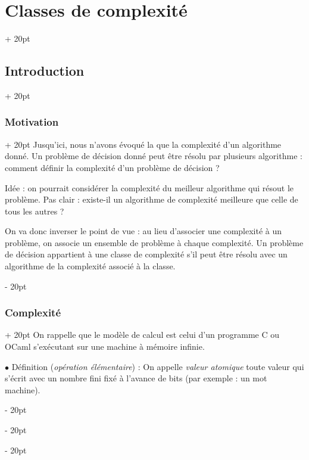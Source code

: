 \documentclass[a4paper, 12pt, twoside]{article}
\newcommand{\ind}[1][20pt]{\advance\leftskip + #1}
\newcommand{\deind}[1][20pt]{\advance\leftskip - #1}
\newenvironment{indt}[2][20pt]{#2 \par \ind[#1]}{\par \deind} %
\begin{document}
    \vspace{12pt}
    
    \begin{indt}{\section{Classes de complexité}}
        \begin{indt}{\subsection{Introduction}}
            \begin{indt}{\subsubsection{Motivation}}
                Jusqu'ici, nous n'avons évoqué la que la complexité d'un algorithme donné.
                Un problème de décision donné peut être résolu par plusieurs algorithme : comment définir la complexité d'un problème de décision ?

                Idée : on pourrait considérer la complexité du meilleur algorithme qui résout le problème.
                Pas clair : existe-il un algorithme de complexité meilleure que celle de tous les autres ?

                On va donc inverser le point de vue : au lieu d'associer une complexité à un problème, on associe un ensemble de problème à chaque complexité.
                Un problème de décision appartient à une classe de complexité s'il peut être résolu avec un algorithme de la complexité associé à la classe.
            \end{indt}

            \vspace{12pt}
            
            \begin{indt}{\subsubsection{Complexité}}
                On rappelle que le modèle de calcul est celui d'un programme C ou OCaml s'exécutant sur une machine à mémoire infinie.

                \vspace{12pt}
                
                $\bullet$ Définition (\textit{opération élémentaire}) :
                On appelle \emph{valeur atomique} toute valeur qui s'écrit avec un nombre fini fixé à l'avance de bits (par exemple : un mot machine).


\end{indt}
\end{indt}
\end{indt}
\end{document}
